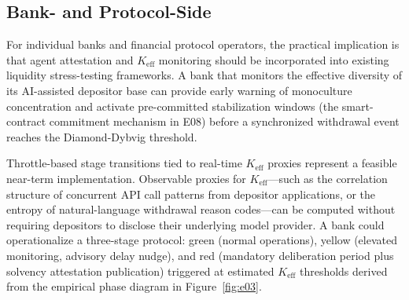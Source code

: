 \subsection{Bank- and Protocol-Side}

For individual banks and financial protocol operators, the practical implication is that agent attestation and $K_{\text{eff}}$ monitoring should be incorporated into existing liquidity stress-testing frameworks. A bank that monitors the effective diversity of its AI-assisted depositor base can provide early warning of monoculture concentration and activate pre-committed stabilization windows (the smart-contract commitment mechanism in E08) before a synchronized withdrawal event reaches the Diamond-Dybvig threshold.

Throttle-based stage transitions tied to real-time $K_{\text{eff}}$ proxies represent a feasible near-term implementation. Observable proxies for $K_{\text{eff}}$---such as the correlation structure of concurrent API call patterns from depositor applications, or the entropy of natural-language withdrawal reason codes---can be computed without requiring depositors to disclose their underlying model provider. A bank could operationalize a three-stage protocol: green (normal operations), yellow (elevated monitoring, advisory delay nudge), and red (mandatory deliberation period plus solvency attestation publication) triggered at estimated $K_{\text{eff}}$ thresholds derived from the empirical phase diagram in Figure~\ref{fig:e03}.

